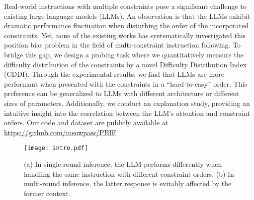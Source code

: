Real-world instructions with multiple constraints pose a significant challenge to existing large language models (LLMs). An observation is that the LLMs exhibit dramatic performance fluctuation when disturbing the order of the incorporated constraints. Yet, none of the existing works has systematically investigated this position bias problem in the field of multi-constraint instruction following. To bridge this gap, we design a probing task where we quantitatively measure the difficulty distribution of the constraints by a novel Difficulty Distribution Index (CDDI). Through the experimental results, we find that LLMs are more performant when presented with the constraints in a ``hard-to-easy'' order. This preference can be generalized to LLMs with different architecture or different sizes of parameters. Additionally, we conduct an explanation study, providing an intuitive insight into the correlation between the LLM's attention and constraint orders. Our code and dataset are publicly available at \url{https://github.com/meowpass/PBIF}.


\begin{figure}[t] 
    \centering
        \texttt{[image: intro.pdf]}
    \caption{(a) In single-round inference, the LLM performs differently when handling the same instruction with different constraint orders. (b) In multi-round inference, the latter response is evitably affected by the former context.}
    \label{fig:intro}
\end{figure}